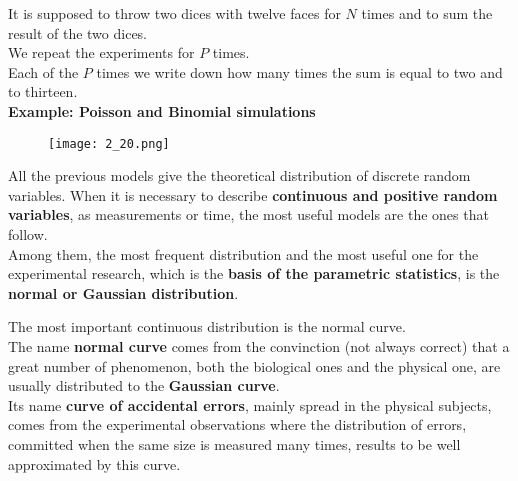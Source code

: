 \begin{frame}
  \begin{small}
    It is supposed to throw two dices with twelve faces for $ N $ times and to sum the result of the two dices.\\
    \vspace*{.2cm}
    We repeat the experiments for $ P $ times.\\
    \vspace*{.2cm}
    Each of the $ P $ times we write down how many times the sum is equal to two and to thirteen.\\
    \vspace*{.2cm}
    \centering
    \textbf{Example: Poisson and Binomial simulations}\\              
  \end{small}
  \begin{figure}
    \texttt{[image: 2\_20.png]}
  \end{figure}
\end{frame}




\begin{frame}
  \vspace*{.5cm}
  All the previous models give the theoretical distribution of discrete random variables. When it is necessary to describe \textbf{continuous and positive random variables}, as measurements or time, the most useful models are the ones that follow.\\
  \vspace*{.5cm}
  Among them, the most frequent distribution and the most useful one for the experimental research, which is the \textbf{basis of the parametric statistics}, is the \textbf{normal or Gaussian distribution}.
\end{frame}


\begin{frame}
  \vspace*{.5cm}
  The most important continuous distribution is the normal curve.\\
  \vspace*{.5cm}
  The name \textbf{normal curve} comes from the convinction (not always correct) that a great number of phenomenon, both the biological ones and the physical one, are usually distributed  to the \textbf{Gaussian curve}.\\
  \vspace*{.5cm}
  Its name \textbf{curve of accidental errors}, mainly spread in the physical subjects, comes from the experimental observations where the distribution of errors, committed when the same size is measured many times, results to be well approximated by this curve.
\end{frame}

